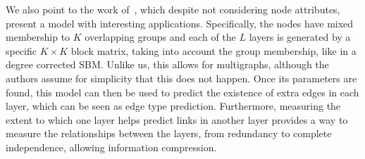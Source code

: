 We also point to the work of~\textcite{DeBacco2017}, which despite not considering node attributes,
present a model with interesting applications. Specifically, the nodes have mixed membership to $K$
overlapping groups and each of the $L$ layers is generated by a specific $K\times K$ block matrix, taking
into account the group membership, like in a degree corrected SBM. Unlike us, this allows for
multigraphs, although the authors assume for simplicity that this does not happen. Once its
parameters are found, this model can then be used to predict the existence of extra edges in each
layer, which can be seen as edge type prediction. Furthermore, measuring the extent to which one
layer helps predict links in another layer provides a way to measure the relationships between the
layers, from redundancy to complete independence, allowing information compression.
